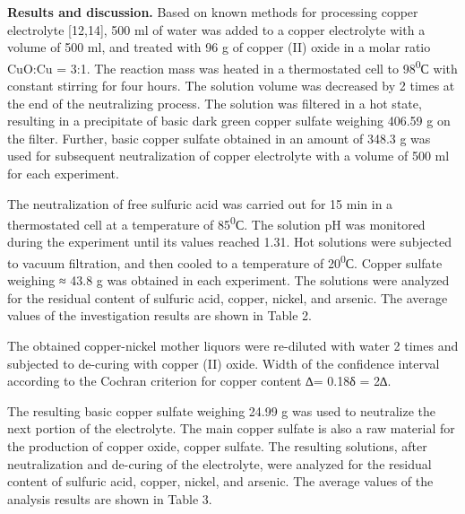 \begin{multicols}{2}
{\bfseries Results and discussion.} Based on known methods for processing
copper electrolyte {[}12,14{]}, 500 ml of water was added to a copper
electrolyte with a volume of 500 ml, and treated with 96 g of copper
(II) oxide in a molar ratio CuO:Cu = 3:1. The reaction mass was heated
in a thermostated cell to 98\textsuperscript{0}С with constant stirring
for four hours. The solution volume was decreased by 2 times at the end
of the neutralizing process. The solution was filtered in a hot state,
resulting in a precipitate of basic dark green copper sulfate weighing
406.59 g on the filter. Further, basic copper sulfate obtained in an
amount of 348.3 g was used for subsequent neutralization of copper
electrolyte with a volume of 500 ml for each experiment.

The neutralization of free sulfuric acid was carried out for 15 min in a
thermostated cell at a temperature of 85\textsuperscript{0}С. The
solution pH was monitored during the experiment until its values reached
1.31. Hot solutions were subjected to vacuum filtration, and then cooled
to a temperature of 20\textsuperscript{0}С. Copper sulfate weighing ≈
43.8 g was obtained in each experiment. The solutions were analyzed for
the residual content of sulfuric acid, copper, nickel, and arsenic. The
average values of the investigation results are shown in Table 2.

The obtained copper-nickel mother liquors were re-diluted with water 2
times and subjected to de-curing with copper (II) oxide. Width of the
confidence interval according to the Cochran criterion for copper
content ∆= 0.18δ = 2∆.

The resulting basic copper sulfate weighing 24.99 g was used to
neutralize the next portion of the electrolyte. The main copper sulfate
is also a raw material for the production of copper oxide, copper
sulfate. The resulting solutions, after neutralization and de-curing of
the electrolyte, were analyzed for the residual content of sulfuric
acid, copper, nickel, and arsenic. The average values of the analysis
results are shown in Table 3.
\end{multicols}


